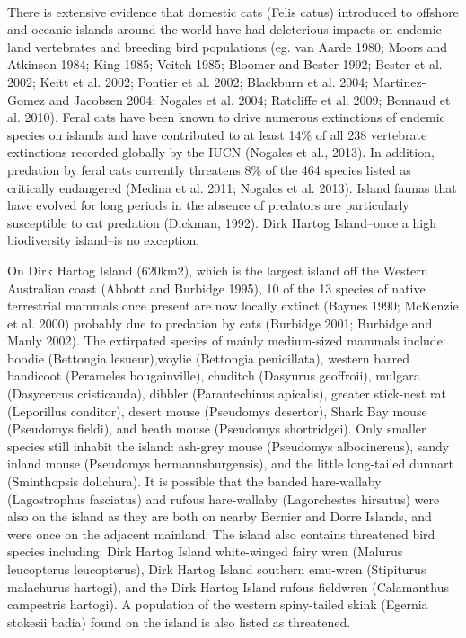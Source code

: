 \documentclass[version=last,
    paper=a4,                               %
    10pt,                                   %
    dvipsnames,
    oneside,                              %
    headings=openany,                       %
    open=any,
    BCOR=7mm,                               %
    DIV=15,     %
]{scrbook}
\begin{document}
~

There is extensive evidence that domestic cats (Felis catus) introduced
to offshore and oceanic islands around the world have had deleterious
impacts on endemic land vertebrates and breeding bird populations (eg.
van Aarde 1980; Moors and Atkinson 1984; King 1985; Veitch 1985; Bloomer
and Bester 1992; Bester et al. 2002; Keitt et al. 2002; Pontier et al.
2002; Blackburn et al. 2004; Martinez-Gomez and Jacobsen 2004; Nogales
et al. 2004; Ratcliffe et al. 2009; Bonnaud et al. 2010). Feral cats
have been known to drive numerous extinctions of endemic species on
islands and have contributed to at least 14\% of all 238 vertebrate
extinctions recorded globally by the IUCN (Nogales et al., 2013). In
addition, predation by feral cats currently threatens 8\% of the 464
species listed as critically endangered (Medina et al. 2011; Nogales et
al. 2013). Island faunas that have evolved for long periods in the
absence of predators are particularly susceptible to cat predation
(Dickman, 1992). Dirk Hartog Island--once a high biodiversity island--is
no exception.

On Dirk Hartog Island (620km2), which is the largest island off the
Western Australian coast (Abbott and Burbidge 1995), 10 of the 13
species of native terrestrial mammals once present are now locally
extinct (Baynes 1990; McKenzie et al. 2000) probably due to predation by
cats (Burbidge 2001; Burbidge and Manly 2002). The extirpated species of
mainly medium-sized mammals include: boodie (Bettongia lesueur),woylie
(Bettongia penicillata), western barred bandicoot (Perameles
bougainville), chuditch (Dasyurus geoffroii), mulgara (Dasycercus
cristicauda), dibbler (Parantechinus apicalis), greater stick-nest rat
(Leporillus conditor), desert mouse (Pseudomys desertor), Shark Bay
mouse (Pseudomys fieldi), and heath mouse (Pseudomys shortridgei). Only
smaller species still inhabit the island: ash-grey mouse (Pseudomys
albocinereus), sandy inland mouse (Pseudomys hermannsburgensis), and the
little long-tailed dunnart (Sminthopsis dolichura). It is possible that
the banded hare-wallaby (Lagostrophus fasciatus) and rufous hare-wallaby
(Lagorchestes hirsutus) were also on the island as they are both on
nearby Bernier and Dorre Islands, and were once on the adjacent
mainland. The island also contains threatened bird species including:
Dirk Hartog Island white-winged fairy wren (Malurus leucopterus
leucopterus), Dirk Hartog Island southern emu-wren (Stipiturus
malachurus hartogi), and the Dirk Hartog Island rufous fieldwren
(Calamanthus campestris hartogi). A population of the western
spiny-tailed skink (Egernia stokesii badia) found on the island is also
listed as threatened.
\end{document}
